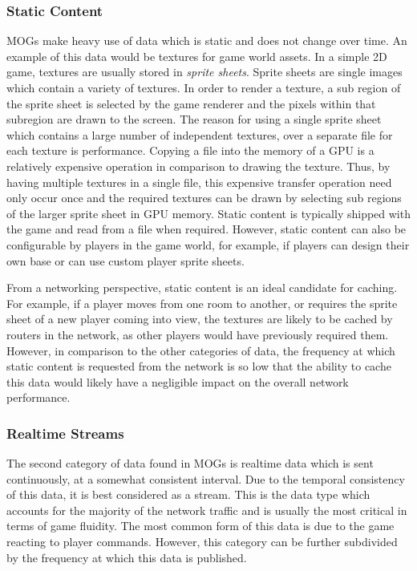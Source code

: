 \subsubsection*{Static Content}
MOGs make heavy use of data which is static and does not change over time. An example of this data would be textures for game world assets. In a simple 2D game, textures are usually stored in \textit{sprite sheets}. Sprite sheets are single images which contain a variety of textures. In order to render a texture, a sub region of the sprite sheet is selected by the game renderer and the pixels within that subregion are drawn to the screen. The reason for using a single sprite sheet which contains a large number of independent textures, over a separate file for each texture is performance. Copying a file into the memory of a GPU is a relatively expensive operation in comparison to drawing the texture. Thus, by having multiple textures in a single file, this expensive transfer operation need only occur once and the required textures can be drawn by selecting sub regions of the larger sprite sheet in GPU memory. Static content is typically shipped with the game and read from a file when required. However, static content can also be configurable by players in the game world, for example, if players can design their own base or can use custom player sprite sheets.  

From a networking perspective, static content is an ideal candidate for caching. For example, if a player moves from one room to another, or requires the sprite sheet of a new player coming into view, the textures are likely to be cached by routers in the network, as other players would have previously required them. However, in comparison to the other categories of data, the frequency at which static content is requested from the network is so low that the ability to cache this data would likely have a negligible impact on the overall network performance.

\subsubsection*{Realtime Streams}
The second category of data found in MOGs is realtime data which is sent continuously, at a somewhat consistent interval. Due to the temporal consistency of this data, it is best considered as a stream. This is the data type which accounts for the majority of the network traffic and is usually the most critical in terms of game fluidity. The most common form of this data is due to the game reacting to player commands. However, this category can be further subdivided by the frequency at which this data is published. 

